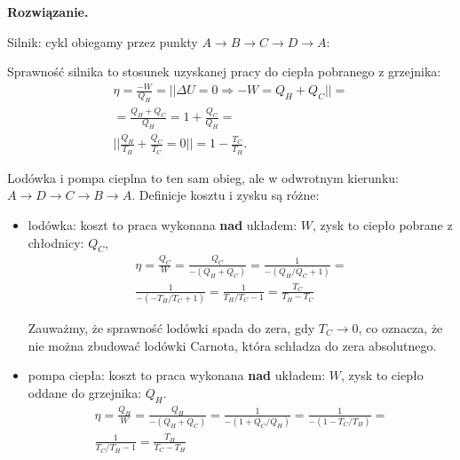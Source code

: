 \documentclass[11pt,a4paper]{article}
\newenvironment{solution}{\vspace{1cm} \par\textbf{Rozwiązanie.} \vspace{1cm}}{}
\begin{document}
\begin{solution}

Silnik: cykl obiegamy przez punkty $A \to B \to C \to D \to A$:

\begin{center}
\begin{minipage}[t]{0.49\textwidth}
\centering

\CarnotPVDiagram

\end{minipage}\hfill
\begin{minipage}[t]{0.49\textwidth}
\centering

\CarnotTSDiagram

\end{minipage}
\end{center}

Sprawność silnika to stosunek uzyskanej pracy do ciepła pobranego z grzejnika:
\begin{align*}
  \eta = \frac{-W}{Q_H} = || \Delta U = 0 \Rightarrow -W = Q_H + Q_C || = \\
   = \frac{Q_H + Q_C}{Q_H} = 1 + \frac{Q_C}{Q_H} =  \\
   || \frac{Q_H}{T_H} + \frac{Q_C}{T_C} = 0 || = 1 - \frac{T_C}{T_H}.
\end{align*}

Lodówka i pompa cieplna to ten sam obieg, 
ale w odwrotnym kierunku: $ A \to D \to C \to B \to A$.
Definicje kosztu i zysku są różne:
\begin{itemize}
  \item lodówka: koszt to praca wykonana {\bf nad} układem: $W$, 
         zysk to ciepło pobrane z chłodnicy: $Q_C$,
\begin{align*}
  \eta = \frac{Q_C}{W} = \frac{Q_C}{-(Q_H + Q_C)} = \frac{1}{-(Q_H/Q_C + 1)} = \\ 
  \frac{1}{-(-T_H/T_C + 1)} = \frac{1}{T_H/T_C - 1} = \frac{T_C}{T_H - T_C}
\end{align*}

Zauważmy, że sprawność lodówki spada do zera, gdy $T_C \to 0$, 
co oznacza, że nie można zbudować lodówki Carnota, która schładza do zera absolutnego.


  \item pompa ciepła: koszt to praca wykonana {\bf nad} układem: $W$, zysk to ciepło oddane do grzejnika: $Q_H$.
\begin{align*}
  \eta = \frac{Q_H}{W} = \frac{Q_H}{-(Q_H + Q_C)} = 
  \frac{1}{-(1 + Q_C/Q_H)} = \frac{1}{-(1 - T_C/T_H)} = \\
  \frac{1}{T_C/T_H - 1} =    \frac{T_H}{T_C - T_H}
\end{align*}
\end{itemize}


\end{solution}
\end{document}
